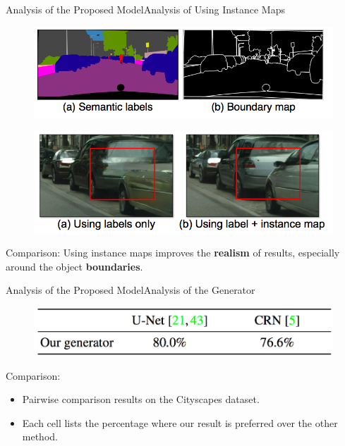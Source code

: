 \documentclass{beamer}
\begin{document}
\begin{frame}{Analysis of  the Proposed Model}{Analysis of  Using Instance Maps}
	\begin{figure}
		\centering
		\includegraphics[height=0.25\textheight]{images/instance_maps}
	\end{figure}
\begin{figure}
	\centering
	\includegraphics[height=0.3\textheight]{images/instance_result}
\end{figure}
%
%
\begin{beamerboxesrounded}[upper=uppercol,lower=lowercol,shadow=false]{Comparison: }
Using instance maps improves the \textbf{realism} of  results, especially around the object \textbf{boundaries}.
\end{beamerboxesrounded}
\end{frame}

\begin{frame}{Analysis of the Proposed Model}{Analysis of  the Generator}
\begin{figure}
	\centering
	\includegraphics[height=0.2\textheight]{images/table_3}
\end{figure}
%
%
\begin{beamerboxesrounded}[upper=uppercol,lower=lowercol,shadow=false]{Comparison: }
	\begin{itemize}
		\item
Pairwise comparison results on the Cityscapes dataset.
\item
 Each cell lists the percentage where our result is preferred over the other method.
 \end{itemize}
\end{beamerboxesrounded}
\end{frame}
\end{document}

